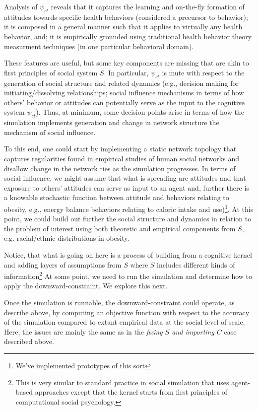 \documentclass{article}
\begin{document}
Analysis of $\psi_{ct}$ reveals that it captures the learning and on-the-fly formation of attitudes towards specific health behaviors (considered a precursor to behavior); it is composed in a general manner such that it applies to virtually any health behavior, and; it is empirically grounded using traditional health behavior theory measurment techniques (in one particular behavioral domain). 

These features are useful, but some key components are missing that are akin to first principles of social system $S$.  In particular, $\psi_{ct}$ is mute with respect to the generation of social structure and related dynamics (e.g., decision making for initiating/dissolving relationships; social influence mechanisms in terms of how others' behavior or attitudes can potentially serve as the input to the cognitive system $\psi_{ct}$).  Thus, at minimum, some decision points arise in terms of how the simulation implements generation and change in network structure the mechanism of social influence.  

To this end, one could start by implementing a static network topology that captures regularities found in empirical studies of human social networks and disallow change in the network ties as the simulation progresses.  In terms of social influence, we might assume that what is spreading are attitudes and that exposure to others' attitudes can serve as input to an agent and, further there is a knowable stochastic function between attitude and behaviors relating to obesity, e.g., energy balance behaviors relating to caloric intake and use)\footnote{We've implemented prototypes of this sort\cite{orr2017galeabook}}. At this point, we could build out further the social structure and dynamics in relation to the problem of interest using both theoretic and empirical components from $S$, e.g. racial/ethnic distributions in obesity.  

Notice, that what is going on here is a process of building from a cognitive kernel and adding layers of assumptions from $S$ where $S$ includes different kinds of information\footnote{This is very similar to standard practice in social simulation that uses agent-based approaches except that the kernel starts from first principles of computational social psychology.}  At some point, we need to run the simulation and determine how to apply the downward-constraint. We explore this next.

Once the simulation is runnable, the downward-constraint could operate, as describe above, by computing an objective function with respect to the accuracy of the simulation compared to extant empirical data at the social level of scale.  Here, the issues are mainly the same as in the \textit{fixing $S$ and importing $C$} case described above.
\end{document}
